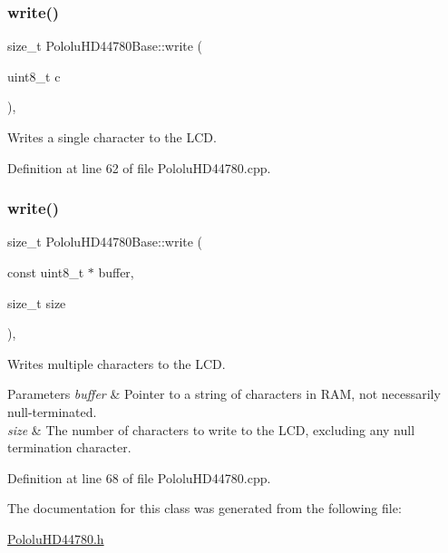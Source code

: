 \subsubsection{\texorpdfstring{write()}{write()}\hspace{0.1cm}{\footnotesize\ttfamily [1/2]}}
{\footnotesize\ttfamily size\+\_\+t Pololu\+H\+D44780\+Base\+::write (\begin{DoxyParamCaption}\item[{uint8\+\_\+t}]{c }\end{DoxyParamCaption})\hspace{0.3cm}{\ttfamily [virtual]}, {\ttfamily [inherited]}}

Writes a single character to the L\+CD. 

Definition at line 62 of file Pololu\+H\+D44780.\+cpp.

\mbox{\label{class_pololu_h_d44780_base_a965028ffd2313e9eaa968348effcab81}} 
\subsubsection{\texorpdfstring{write()}{write()}\hspace{0.1cm}{\footnotesize\ttfamily [2/2]}}
{\footnotesize\ttfamily size\+\_\+t Pololu\+H\+D44780\+Base\+::write (\begin{DoxyParamCaption}\item[{const uint8\+\_\+t $\ast$}]{buffer,  }\item[{size\+\_\+t}]{size }\end{DoxyParamCaption})\hspace{0.3cm}{\ttfamily [virtual]}, {\ttfamily [inherited]}}

Writes multiple characters to the L\+CD.


\begin{DoxyParams}{Parameters}
{\em buffer} & Pointer to a string of characters in R\+AM, not necessarily null-\/terminated. \\
\hline
{\em size} & The number of characters to write to the L\+CD, excluding any null termination character. \\
\hline
\end{DoxyParams}


Definition at line 68 of file Pololu\+H\+D44780.\+cpp.



The documentation for this class was generated from the following file\+:\begin{DoxyCompactItemize}
\item 
\hyperlink{_pololu_h_d44780_8h}{Pololu\+H\+D44780.\+h}\end{DoxyCompactItemize}
